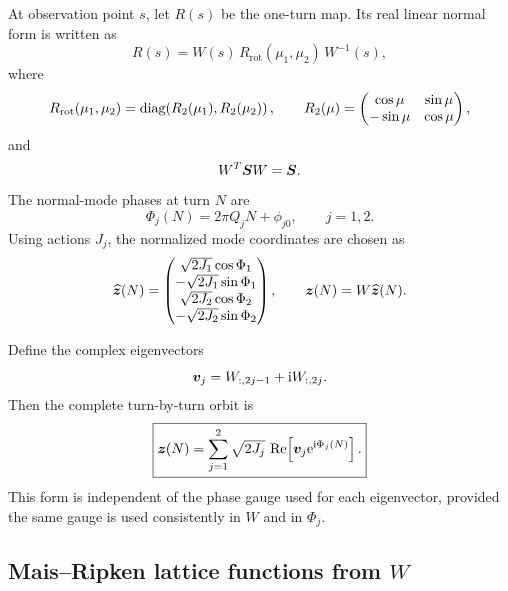 At observation point $s$, let $R(s)$ be the one-turn map.  Its real linear normal form is written as
\begin{equation}
 R(s)=W(s)\,R_{\mathrm{rot}}(\mu_1,\mu_2)\,W^{-1}(s),
 \label{eq:normal-form}
\end{equation}
where
\begin{equation}
 R_{\mathrm{rot}}(\mu_1,\mu_2)
 =\operatorname{diag}\!\left(R_2(\mu_1),R_2(\mu_2)\right),
 \qquad
 R_2(\mu)=
 \begin{pmatrix}
  \cos\mu&\sin\mu\\
  -\sin\mu&\cos\mu
 \end{pmatrix},
\end{equation}
and
\begin{equation}
 W^T\bm{S} W=\bm{S}.
\end{equation}
The normal-mode phases at turn $N$ are
\begin{equation}
 \Phi_j(N)=2\pi Q_jN+\phi_{j0},
 \qquad j=1,2.
\end{equation}
Using actions $J_j$, the normalized mode coordinates are chosen as
\begin{equation}
 \widehat{\bm{z}}(N)=
 \begin{pmatrix}
  \sqrt{2J_1}\cos\Phi_1\\
  -\sqrt{2J_1}\sin\Phi_1\\
  \sqrt{2J_2}\cos\Phi_2\\
  -\sqrt{2J_2}\sin\Phi_2
 \end{pmatrix},
 \qquad
 \bm{z}(N)=W\widehat{\bm{z}}(N).
 \label{eq:mr-orbit-matrix}
\end{equation}

Define the complex eigenvectors
\begin{equation}
 \bm{v}_j=W_{:,2j-1}+\mathrm{i} W_{:,2j}.
\end{equation}
Then the complete turn-by-turn orbit is
\begin{equation}
 \boxed{
 \bm{z}(N)=\sum_{j=1}^{2}\sqrt{2J_j}\,
 \operatorname{Re}\!\left[\bm{v}_j\mathrm{e}^{\mathrm{i}\Phi_j(N)}\right].
 }
 \label{eq:mr-orbit-complex}
\end{equation}
This form is independent of the phase gauge used for each eigenvector, provided the same gauge is used consistently in $W$ and in $\Phi_j$.

\subsection{Mais--Ripken lattice functions from $W$}

